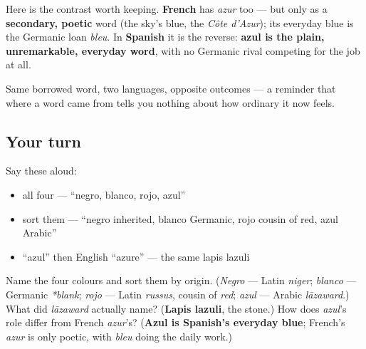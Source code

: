 \begin{culture}
Here is the contrast worth keeping. \textbf{French} has \emph{azur} too — but only as a \textbf{secondary, poetic} word (the sky's blue, the \emph{Côte d'Azur}); its everyday blue is the Germanic loan \emph{bleu}. In \textbf{Spanish} it is the reverse: \textbf{azul is the plain, unremarkable, everyday word}, with no Germanic rival competing for the job at all.

Same borrowed word, two languages, opposite outcomes — a reminder that where a word came from tells you nothing about how ordinary it now feels.
\end{culture}

\subsection*{Your turn}
Say these aloud:

\begin{itemize}
\raggedright
  \item all four — \textquotedblleft{}negro, blanco, rojo, azul\textquotedblright{}
  \item sort them — \textquotedblleft{}negro inherited, blanco Germanic, rojo cousin of red, azul Arabic\textquotedblright{}
  \item \textquotedblleft{}azul\textquotedblright{} then English \textquotedblleft{}azure\textquotedblright{} — the same lapis lazuli
\end{itemize}

\begin{tcolorbox}[breakable,colback=teal!4,colframe=teal!35!black,title={Before you move on}]
Name the four colours and sort them by origin. (\emph{Negro} — Latin \emph{niger}; \emph{blanco} — Germanic \emph{*blank}; \emph{rojo} — Latin \emph{russus}, cousin of \emph{red}; \emph{azul} — Arabic \emph{lāzaward}.) What did \emph{lāzaward} actually name? (\textbf{Lapis lazuli}, the stone.) How does \emph{azul}'s role differ from French \emph{azur}'s? (\textbf{Azul is Spanish's everyday blue}; French's \emph{azur} is only poetic, with \emph{bleu} doing the daily work.)
\end{tcolorbox}
